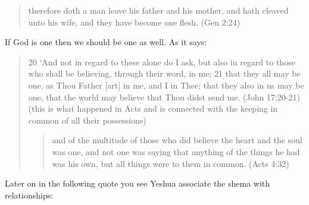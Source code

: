 \documentclass[11pt]{article}
\begin{document}
\begin{quote}
therefore doth a man leave his father and his mother, and hath cleaved unto his wife, and they have become one flesh. (Gen 2:24)
\end{quote}
If God is one then we should be one as well. As it says:\newline
\begin{quote}
20 `And not in regard to these alone do I ask, but also in regard to those who shall be believing, through their word, in me;
21 that they all may be one, as Thou Father [art] in me, and I in Thee; that they also in us may be one, that the world may believe that Thou didst send me. (John 17:20-21)
(this is what happened in Acts and is connected with the keeping in common of all their possessions)
\begin{quote}
and of the multitude of those who did believe the heart and the soul was one, and not one was saying that anything of the things he had was his own, but all things were to them in common. (Acts 4:32)
\end{quote}
\end{quote}
Later on in the following quote you see Yeshua associate the shema with relationships:
\end{document}
